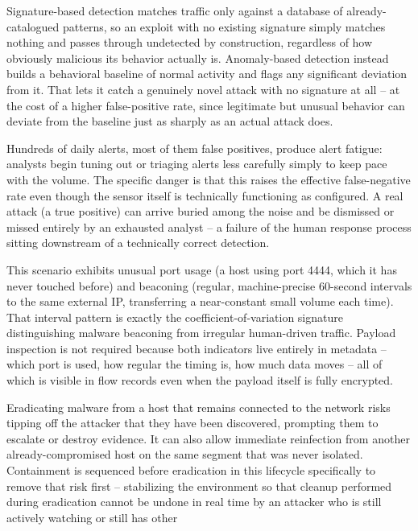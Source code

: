 \begin{answerkey}
\item Signature-based detection matches traffic only against a database of already-catalogued
patterns, so an exploit with no existing signature simply matches nothing and passes through
undetected by construction, regardless of how obviously malicious its behavior actually is.
Anomaly-based detection instead builds a behavioral baseline of normal activity and flags any
significant deviation from it. That lets it catch a genuinely novel attack with no signature at
all -- at the cost of a higher false-positive rate, since legitimate but unusual behavior can
deviate from the baseline just as sharply as an actual attack does.
\item Hundreds of daily alerts, most of them false positives, produce alert fatigue: analysts begin
tuning out or triaging alerts less carefully simply to keep pace with the volume. The specific
danger is that this raises the effective false-negative rate even though the sensor itself is
technically functioning as configured. A real attack (a true positive) can arrive buried among the
noise and be dismissed or missed entirely by an exhausted analyst -- a failure of the human
response process sitting downstream of a technically correct detection.
\item This scenario exhibits unusual port usage (a host using port 4444, which it has never touched
before) and beaconing (regular, machine-precise 60-second intervals to the same external IP,
transferring a near-constant small volume each time). That interval pattern is exactly the
coefficient-of-variation signature distinguishing malware beaconing from irregular human-driven
traffic. Payload inspection is not required because both indicators live entirely in metadata --
which port is used, how regular the timing is, how much data moves -- all of which is visible in
flow records even when the payload itself is fully encrypted.
\item Eradicating malware from a host that remains connected to the network risks tipping off the
attacker that they have been discovered, prompting them to escalate or destroy evidence. It can
also allow immediate reinfection from another already-compromised host on the same segment that was
never isolated. Containment is sequenced before eradication in this lifecycle specifically to
remove that risk first -- stabilizing the environment so that cleanup performed during eradication
cannot be undone in real time by an attacker who is still actively watching or still has other

\end{answerkey}
